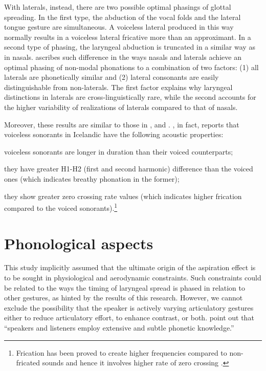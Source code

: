 \documentclass[11pt,a4paper,oneside,openany]{memoir}\usepackage[]{graphicx}\usepackage[]{color}
\begin{document}
With laterals, instead, there are two possible optimal phasings of glottal spreading.
In the first type, the abduction of the vocal folds and the lateral tongue gesture are simultaneous.
A voiceless lateral produced in this way normally results in a voiceless lateral fricative more than an approximant.
In a second type of phasing, the laryngeal abduction is truncated in a similar way as in nasals.
\citet{silverman1997} ascribes such difference in the ways nasals and laterals achieve an optimal phasing of non-modal phonations to a combination of two factors: (1) all laterals are phonetically similar and (2) lateral consonants are easily distinguishable from non-laterals.
The first factor explains why laryngeal distinctions in laterals are cross-linguistically rare, while the second accounts for the higher variability of realizations of laterals compared to that of nasals.

Moreover, these results are similar to those in \citet{jessen1998}, \citet{bombien2006} and \citet{silverman2012}.
\citet{bombien2006}, in fact, reports that voiceless sonorants in Icelandic have the following acoustic properties: 
\begin{inparaenum}[(i)]
\item voiceless sonorants are longer in duration than their voiced counterparts;
\item they have greater H1-H2 (first and second harmonic) difference than the voiced ones (which indicates breathy phonation in the former);
\item they show greater zero crossing rate values (which indicates higher frication compared to the voiced sonorants).\footnote{Frication has been proved to create higher frequencies compared to non-fricated sounds and hence it involves higher rate of zero crossing \citep{weigelt1990}.}
\end{inparaenum}


\section{Phonological aspects}
\label{s:linguistic}
This study implicitly assumed that the ultimate origin of the aspiration effect is to be sought in physiological and aerodynamic constraints.
Such constraints could be related to the ways the timing of laryngeal spread is phased in relation to other gestures, as hinted by the results of this research.
However, we cannot exclude the possibility that the speaker is actively varying articulatory gestures either to reduce articulatory effort, to enhance contrast, or both.
\citet[p. 423]{kingston1994} point out that ``speakers and listeners employ extensive and subtle phonetic knowledge.''
\end{document}
